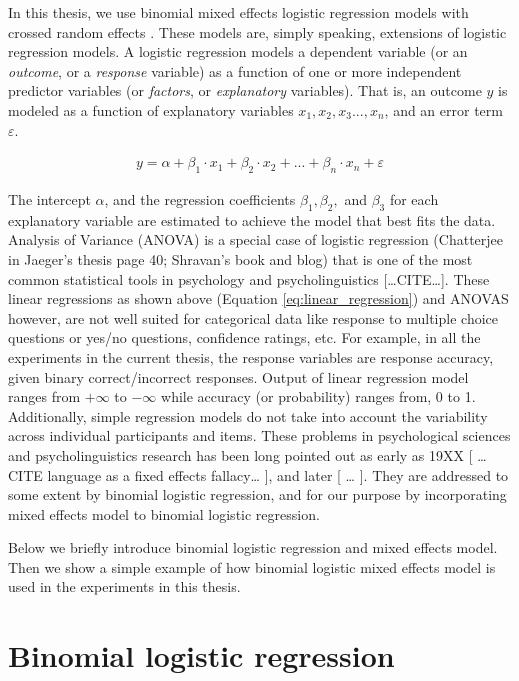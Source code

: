 \documentclass[a4paper, nobind]{templates/ociamthesis}
\begin{document}
In this thesis, we use binomial mixed effects logistic regression models with crossed random effects \autocite{Baayen2008}.
These models are, simply speaking, extensions of logistic regression models.
A logistic regression models a dependent variable (or an \emph{outcome}, or a \emph{response} variable) as a function of one or more independent predictor variables (or \emph{factors}, or \emph{explanatory} variables).
That is, an outcome \(y\) is modeled as a function of explanatory variables \(x_1, x_2, x_3..., x_n\), and an error term \(\varepsilon\).

\begin{align} \label{eq:linear_regression}
y =
\alpha + 
\beta_{1}\cdot{x_1} + 
\beta_{2}\cdot{x_2} + ... +
\beta_{n}\cdot{x_n} + \varepsilon 
\end{align}

The intercept \(\alpha\), and the regression coefficients \(\beta_1, \beta_2,\) and \(\beta_3\) for each explanatory variable are estimated to achieve the model that best fits the data.
Analysis of Variance (ANOVA) is a special case of logistic regression (Chatterjee in Jaeger's thesis page 40; Shravan's book and blog) that is one of the most common statistical tools in psychology and psycholinguistics {[}\ldots CITE\ldots{]}.
These linear regressions as shown above (Equation \ref{eq:linear_regression}) and ANOVAS however, are not well suited for categorical data like response to multiple choice questions or yes/no questions, confidence ratings, etc.
For example, in all the experiments in the current thesis, the response variables are response accuracy, given binary correct/incorrect responses.
Output of linear regression model ranges from \(+\infty\) to \(-\infty\) while accuracy (or probability) ranges from, 0 to 1.
Additionally, simple regression models do not take into account the variability across individual participants and items.
These problems in psychological sciences and psycholinguistics research has been long pointed out as early as 19XX {[} \ldots CITE language as a fixed effects fallacy\ldots{} {]}, and later {[} \ldots{} {]}.
They are addressed to some extent by binomial logistic regression, and for our purpose by incorporating mixed effects model to binomial logistic regression.

Below we briefly introduce binomial logistic regression and mixed effects model.
Then we show a simple example of how binomial logistic mixed effects model is used in the experiments in this thesis.

\hypertarget{binomial-logistic-regression}{%
\section{Binomial logistic regression}\label{binomial-logistic-regression}}
\end{document}
